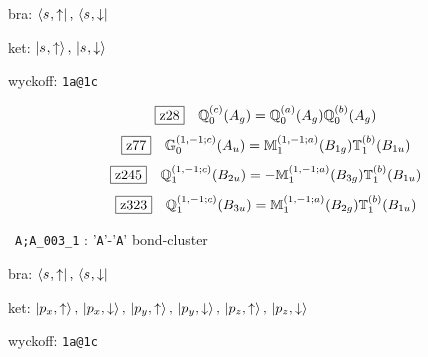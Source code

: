 \documentclass[fleqn,10pt,landscape]{jsarticle}
\begin{document}
\noindent\quad * bra: $\bra{s_{},\uparrow},\, \bra{s_{},\downarrow}$

\noindent\quad * ket: $\ket{s_{},\uparrow},\, \ket{s_{},\downarrow}$

\noindent\quad * wyckoff: \texttt{1a@1c}

\begin{dmath*}
\hspace*{3mm}\fbox{z28}\quad \mathbb{Q}_{0}^{(c)}(A_{g})=\mathbb{Q}_{0}^{(a)}(A_{g}) \mathbb{Q}_{0}^{(b)}(A_{g})
\end{dmath*}
\begin{dmath*}
\hspace*{3mm}\fbox{z77}\quad \mathbb{G}_{0}^{(1,-1;c)}(A_{u})=\mathbb{M}_{1}^{(1,-1;a)}(B_{1g}) \mathbb{T}_{1}^{(b)}(B_{1u})
\end{dmath*}
\begin{dmath*}
\hspace*{3mm}\fbox{z245}\quad \mathbb{Q}_{1}^{(1,-1;c)}(B_{2u})=- \mathbb{M}_{1}^{(1,-1;a)}(B_{3g}) \mathbb{T}_{1}^{(b)}(B_{1u})
\end{dmath*}
\begin{dmath*}
\hspace*{3mm}\fbox{z323}\quad \mathbb{Q}_{1}^{(1,-1;c)}(B_{3u})=\mathbb{M}_{1}^{(1,-1;a)}(B_{2g}) \mathbb{T}_{1}^{(b)}(B_{1u})
\end{dmath*}
\vspace{5mm}

\noindent\textbullet\, \texttt{A;A_003_1} : '\texttt{A}'-'\texttt{A}' bond-cluster

\noindent\quad * bra: $\bra{s_{},\uparrow},\, \bra{s_{},\downarrow}$

\noindent\quad * ket: $\ket{p_{x},\uparrow},\, \ket{p_{x},\downarrow},\, \ket{p_{y},\uparrow},\, \ket{p_{y},\downarrow},\, \ket{p_{z},\uparrow},\, \ket{p_{z},\downarrow}$

\noindent\quad * wyckoff: \texttt{1a@1c}
\end{document}
